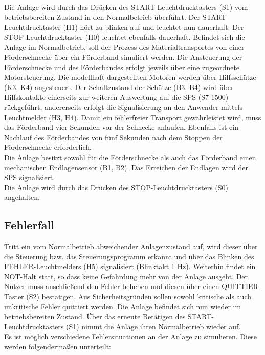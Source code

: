 \documentclass[
	pagesize,
	fontsize=12pt,
	paper=a4,
	oneside,
   reqno
]{scrartcl}
\begin{document}
Die Anlage wird durch das Drücken des START-Leuchtdrucktasters (S1) vom betriebsbereiten Zustand in den Normalbetrieb überführt. Der START-Leuchtdrucktaster (H1) hört zu blinken auf und leuchtet nun dauerhaft. Der STOP-Leuchtdrucktaster (H0) leuchtet ebenfalls dauerhaft. Befindet sich die Anlage im Normalbetrieb, soll der Prozess des Materialtransportes von einer Förderschnecke über ein Förderband simuliert werden. Die Ansteuerung der Förderschnecke und des Förderbandes erfolgt jeweils über eine zugeordnete Motorsteuerung. Die modellhaft dargestellten Motoren werden über Hilfsschütze (K3, K4) angesteuert. Der Schaltzustand der Schütze (B3, B4) wird über Hilfskontakte einerseits zur weiteren Auswertung auf die SPS (S7-1500) rückgeführt, andererseits erfolgt die Signalisierung an den Anwender mittels Leuchtmelder (H3, H4). Damit ein fehlerfreier Transport gewährleistet wird, muss das Förderband vier Sekunden vor der Schnecke anlaufen. Ebenfalls ist ein Nachlauf des Förderbandes von fünf Sekunden nach dem Stoppen der Förderschnecke erforderlich. \\
Die Anlage besitzt sowohl für die Förderschnecke als auch das Förderband einen mechanischen Endlagensensor (B1, B2). Das Erreichen der Endlagen wird der SPS signalisiert. \\
Die Anlage wird durch das Drücken des STOP-Leuchtdrucktasters (S0) angehalten.

\subsection{Fehlerfall}

Tritt ein vom Normalbetrieb abweichender Anlagenzustand auf, wird dieser über die Steuerung bzw. das Steuerungsprogramm erkannt und über das Blinken des FEHLER-Leuchtmelders (H5) signalisiert (Blinktakt 1 Hz). Weiterhin findet ein NOT-Halt statt, so dass keine Gefährdung mehr von der Anlage ausgeht. Der Nutzer muss anschließend den Fehler beheben und diesen über einen QUITTIER-Taster (S2) bestätigen. Aus Sicherheitsgründen sollen sowohl kritische als auch unkritische Fehler quittiert werden. Die Anlage befindet sich nun wieder im betriebsbereiten Zustand. Über das erneute Betätigen des START-Leuchtdrucktasters (S1) nimmt die Anlage ihren Normalbetrieb wieder auf. \\
Es ist möglich verschiedene Fehlersituationen an der Anlage zu simulieren. Diese werden folgendermaßen unterteilt:
\end{document}
